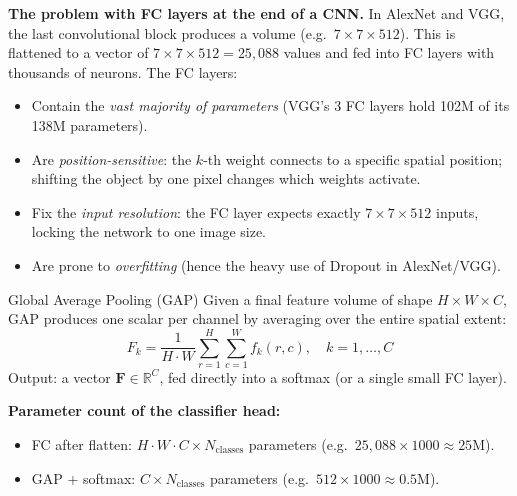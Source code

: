 \documentclass[11pt,a4paper]{article}
\begin{document}
\textbf{The problem with FC layers at the end of a CNN.}  In AlexNet and VGG, the last convolutional block produces a volume (e.g.\ $7\times7\times512$).  This is flattened to a vector of $7\times7\times512 = 25{,}088$ values and fed into FC layers with thousands of neurons.  The FC layers:
\begin{itemize}
  \item Contain the \emph{vast majority of parameters} (VGG's 3 FC layers hold 102M of its 138M parameters).
  \item Are \emph{position-sensitive}: the $k$-th weight connects to a specific spatial position; shifting the object by one pixel changes which weights activate.
  \item Fix the \emph{input resolution}: the FC layer expects exactly $7\times7\times512$ inputs, locking the network to one image size.
  \item Are prone to \emph{overfitting} (hence the heavy use of Dropout in AlexNet/VGG).
\end{itemize}

\begin{defbox}{Global Average Pooling (GAP)}
Given a final feature volume of shape $H\times W\times C$, GAP produces one scalar per channel by averaging over the entire spatial extent:
\[
F_k = \frac{1}{H\cdot W}\sum_{r=1}^{H}\sum_{c=1}^{W} f_k(r,c), \quad k=1,\ldots,C
\]
Output: a vector $\mathbf{F} \in \mathbb{R}^C$, fed directly into a softmax (or a single small FC layer).

\textbf{Parameter count of the classifier head:}
\begin{itemize}
  \item FC after flatten: $H\cdot W\cdot C \times N_\text{classes}$ parameters (e.g.\ $25{,}088\times1000 \approx 25\text{M}$).
  \item GAP + softmax: $C \times N_\text{classes}$ parameters (e.g.\ $512\times1000 \approx 0.5\text{M}$).
\end{itemize}
\end{defbox}
\end{document}
